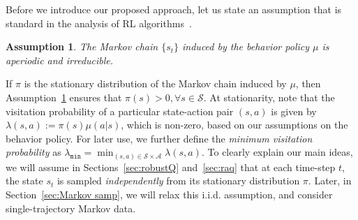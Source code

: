 \documentclass{article}
\newcommand{\mc}{\mathcal}
\newtheorem{assumption}{Assumption}
\begin{document}
Before we introduce our proposed approach, let us state an assumption that is standard in the analysis of RL algorithms~\cite{tsitsiklis94, tsitsiklisroy, bhandari_finite, Qu, li2024q}.  
\begin{assumption}
The Markov chain $\{s_t\}$ induced by the behavior policy $\mu$ is aperiodic and irreducible. 
\label{ass:ergodic}
\end{assumption}
If $\pi$ is the stationary distribution of the Markov chain induced by $\mu$, then Assumption~\ref{ass:ergodic} ensures that $\pi(s) >0, \forall s \in \mc{S}.$ At stationarity, note that the visitation probability of a particular state-action pair $(s,a)$ is given by $\lambda(s,a) := \pi(s) \mu(a|s)$, which is non-zero, based on our assumptions on the behavior policy. For later use, we further define the \emph{minimum visitation probability} as $\lambda_{\texttt{min}} = \min_{(s,a) \in \mc{S} \times \mc{A}} \lambda(s,a).$ To clearly explain our main ideas, we will assume in Sections~\ref{sec:robustQ} and~\ref{sec:raq} that at each time-step $t$, the state $s_t$ is sampled \emph{independently} from its stationary distribution $\pi$. Later, in Section~\ref{sec:Markov samp}, we will relax this i.i.d. assumption, and consider single-trajectory Markov data.

\end{document}
